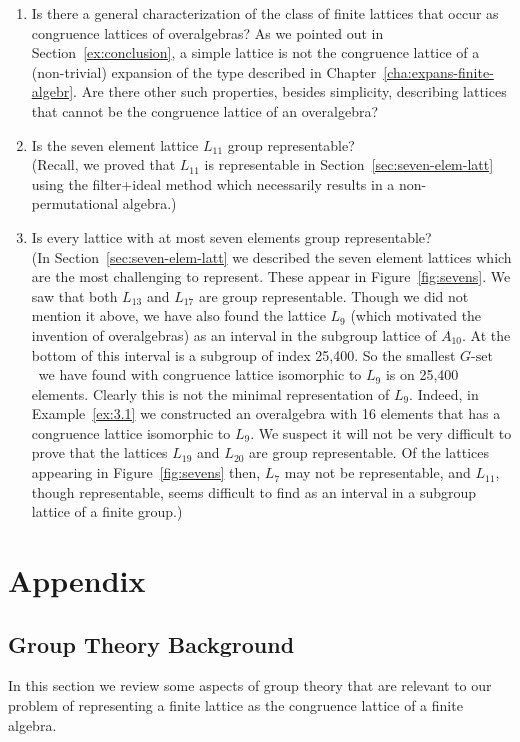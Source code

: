\documentclass[cm,dissertation]{uhthesis}
\theoremstyle{plain}
\theoremstyle{definition}
\theoremstyle{remark}
\numberwithin{theorem}{section}
\numberwithin{claim}{chapter}
\numberwithin{equation}{section}
\numberwithin{conjecture}{chapter}
\newcommand{\<}{\ensuremath{\langle}}
\renewcommand{\>}{\ensuremath{\rangle}}
\newcommand{\0}{\ensuremath{\mathbf{0}}}
\newcommand{\1}{\ensuremath{\mathbf{1}}}
\newcommand{\2}{\ensuremath{\mathbf{2}}}
\newcommand{\3}{\ensuremath{\mathbf{3}}}
\newcommand{\4}{\ensuremath{\mathbf{4}}}
\newcommand{\5}{\ensuremath{\mathbf{5}}}
\newcommand{\Gset}{\ensuremath{G\text{-set}}}
\begin{document}
\begin{enumerate}
\item Is there a general characterization of the class of finite lattices that
  occur as congruence lattices of overalgebras?  As we pointed out in
  Section~\ref{ex:conclusion}, a simple lattice is not the congruence lattice
  of a (non-trivial) expansion of the type described in
  Chapter~\ref{cha:expans-finite-algebr}.  Are there other such
  properties, besides simplicity, describing lattices that cannot be
  the congruence lattice of an overalgebra?

\item Is the seven element lattice $L_{11}$ group representable? \\
  (Recall, we proved that $L_{11}$ is representable in
  Section~\ref{sec:seven-elem-latt} using the filter+ideal method which
  necessarily results in a non-permutational algebra.) 

\item Is every lattice with at most seven elements group representable?\\
  (In Section~\ref{sec:seven-elem-latt} we described the
  seven element lattices which are the most challenging to represent.  These
  appear in Figure~\ref{fig:sevens}.
  We saw that both $L_{13}$ and $L_{17}$ are group representable.
  Though we did not mention it above, we have also found the lattice $L_9$ 
  (which motivated the invention of overalgebras) as an interval in the subgroup
  lattice of $A_{10}$.  At the bottom of this interval is a subgroup of index
  25,400.  So the smallest \Gset\ we have found with congruence lattice
  isomorphic to $L_9$ is on 25,400 elements.  
  Clearly this is not the minimal representation of $L_9$. Indeed, in
  Example~\ref{ex:3.1} we constructed an overalgebra with 16
  elements that has a congruence lattice isomorphic to $L_9$.  We suspect it
  will not be very difficult to prove that the lattices $L_{19}$ and $L_{20}$
  are group representable.  Of the lattices appearing in
  Figure~\ref{fig:sevens} then, $L_7$ may not be representable,
  and $L_{11}$, though representable, seems difficult
  to find as an interval in a subgroup lattice of a finite group.)
\end{enumerate}

\appendix

\part{Appendix}
\chapter{Group Theory Background}
\label{cha:group-theory-backgr}
In this section we review some aspects of group theory that
are relevant to our problem of representing a finite lattice as the congruence
lattice of a finite algebra.
\end{document}
